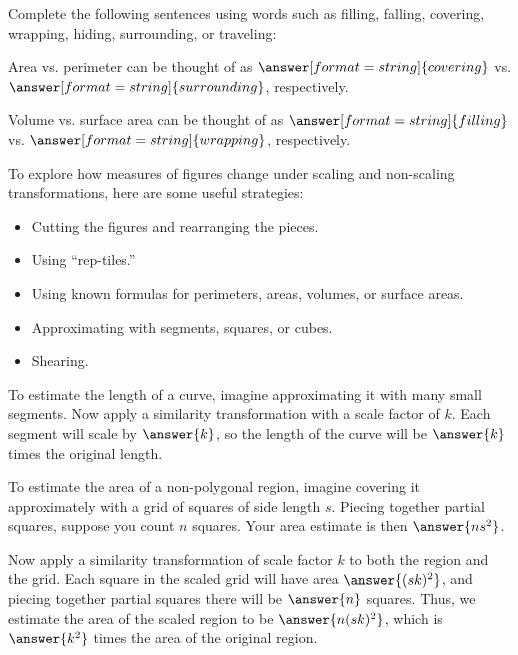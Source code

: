 \documentclass[nooutcomes]{ximera}
\begin{document}
\begin{question}
Complete the following sentences using words such as filling, falling, covering, wrapping, hiding, surrounding, or traveling:  

Area vs. perimeter can be thought of as $\answer[format=string]{covering}$ vs. $\answer[format=string]{surrounding}$, respectively. 

Volume vs. surface area can be thought of as $\answer[format=string]{filling}$ vs. $\answer[format=string]{wrapping}$, respectively. 
\end{question}


To explore how measures of figures change under scaling and non-scaling transformations, here are some useful strategies: 
\begin{itemize}
\item Cutting the figures and rearranging the pieces.  
\item Using ``rep-tiles.'' 
\item Using known formulas for perimeters, areas, volumes, or surface areas. 
\item Approximating with segments, squares, or cubes.  
\item Shearing.
\end{itemize}



\begin{question}
To estimate the length of a curve, imagine approximating it with many small segments.  Now apply a similarity transformation with a scale factor of $k$.  Each segment will scale by $\answer{k}$, so the length of the curve will be $\answer{k}$ times the original length.  
\end{question}

\begin{question}
To estimate the area of a non-polygonal region, imagine covering it approximately with a grid of squares of side length $s$.   Piecing together partial squares, suppose you count $n$ squares.  Your area estimate is then $\answer{ns^2}$.  

Now apply a similarity transformation of scale factor $k$ to both the region and the grid.  Each square in the scaled grid will have 
area $\answer{(sk)^2}$, and piecing together partial squares there will be $\answer{n}$ squares.  Thus, we estimate the area of the scaled region to be $\answer{n(sk)^2}$, which is $\answer{k^2}$ times the area of the original region.  
\end{question}
\end{document}
